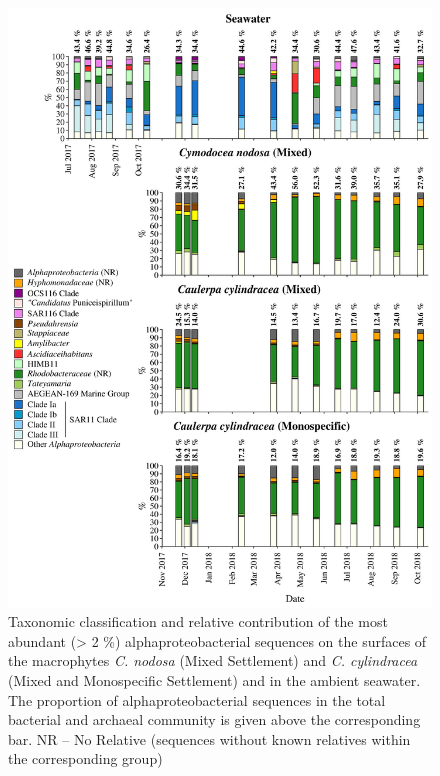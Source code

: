 \documentclass[12pt,]{article}
\begin{document}
\begin{figure}[H]

{\centering \includegraphics[width=0.85\linewidth]{../results/figures/alphaproteobacteria_bar_plot} 

}

\caption{Taxonomic classification and relative contribution of the most abundant (> 2 \si{\percent}) alphaproteobacterial sequences on the surfaces of the macrophytes \textit{C. nodosa} (Mixed Settlement) and \textit{C. cylindracea} (Mixed and Monospecific Settlement) and in the ambient seawater. The proportion of alphaproteobacterial sequences in the total bacterial and archaeal community is given above the corresponding bar. NR -- No Relative (sequences without known relatives within the corresponding group)\label{alpha}}\label{fig:unnamed-chunk-7}
\end{figure}
\end{document}
